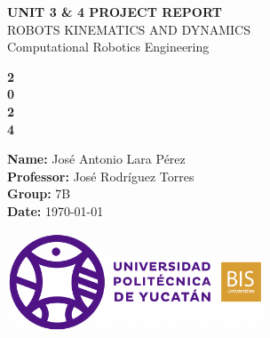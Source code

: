 \documentclass[12pt]{article}
\begin{document}
    \begin{titlepage}
        \thispagestyle{empty}
        \begin{spacing}{1.5}
            {\Huge \bfseries \noindent UNIT 3 \& 4 PROJECT REPORT}\\[15pt]
            {\LARGE ROBOTS KINEMATICS AND DYNAMICS}\\
            {\large Computational Robotics Engineering}\\[1.5cm]
        \end{spacing}
        \begin{minipage}{2cm}
            \hspace{0.5cm}     
        \end{minipage}
        \hfill
        \begin{minipage}{5cm}
            \begin{spacing}{4}
                {\fontsize{70}{70}\selectfont \bfseries \color{white}2\\0\\2\\4}
            \end{spacing}
        \end{minipage}
        \vfil
        \begin{flushleft}
            \begin{minipage}{6cm}
                {\color{white}
                \textbf{Name: }Jos\'e Antonio Lara P\'erez\\
                \textbf{Professor: }Jos\'e Rodr\'iguez Torres\\
                \textbf{Group: }7B\\
                \textbf{Date: }\today}
            \end{minipage}
            \hfill
            \begin{minipage}{8cm}
                \includegraphics[width = 3in]{Upy-logo-large.png}
            \end{minipage}
        \end{flushleft}

    \end{titlepage}
\end{document}
